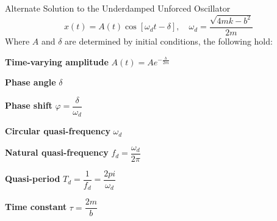 \documentclass{beamer}
\begin{document}
\begin{frame}
\begin{block}{Alternate Solution to the Underdamped Unforced Oscillator}
\begin{equation*}
x(t)=A(t)\cos[\omega_d t - \delta]
,\quad
\omega_d=\dfrac{\sqrt{4mk-b^2}}{2m}
\end{equation*}
Where $A$ and $\delta$ are determined by initial conditions, the following hold:
\begin{dynitemize}[<+- | alert@+>]
\item\textbf{Time-varying amplitude} $A(t)=Ae^{-\tfrac{b}{2m}}$
\item\textbf{Phase angle} $\delta$
\item\textbf{Phase shift} $\varphi=\dfrac{\delta}{\omega_d}$
\item\textbf{Circular quasi-frequency} $\omega_d$
\item\textbf{Natural quasi-frequency} $f_d=\dfrac{\omega_d}{2\pi}$
\item\textbf{Quasi-period} $T_d=\dfrac{1}{f_d}=\dfrac{2pi}{\omega_d}$
\item\textbf{Time constant} $\tau=\dfrac{2m}{b}$
\end{dynitemize}
\end{block}
\end{frame}
\end{document}
